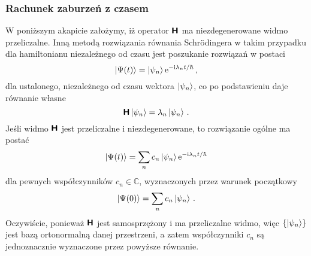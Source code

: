 \documentclass{myclass}
\begin{document}
\subsubsection{Rachunek zaburzeń z czasem}
W poniższym akapicie założymy, iż operator \(\boldsymbol{\mathsf{H}}\) ma niezdegenerowane widmo przeliczalne. Inną
metodą rozwiązania równania Schr\"{o}dingera w takim przypadku dla hamiltonianu niezależnego od
czasu jest poszukanie rozwiązań w postaci
\begin{equation*}
    \ket{\Psi(t)} = \ket{\psi_n}\mathrm{e}^{-\mathrm{i}\lambda_nt/\hbar}\,,
\end{equation*}
dla ustalonego, niezależnego od czasu wektora \(\ket{\psi_n}\), co po podstawieniu daje równanie
własne
\begin{equation*}
    \boldsymbol{\mathsf{H}}\ket{\psi_n} = \lambda_n\ket{\psi_n}\,.
\end{equation*}
Jeśli widmo \(\boldsymbol{\mathsf{H}}\) jest przeliczalne i niezdegenerowane, to rozwiązanie ogólne ma postać
\begin{equation*}
    \ket{\Psi(t)} = \sum_n c_n\ket{\psi_n}\mathrm{e}^{-\mathrm{i}\lambda_nt/\hbar}
\end{equation*}
dla pewnych współczynników \(c_n\in\mathbb{C}\), wyznaczonych przez warunek początkowy
\begin{equation*}
    \ket{\Psi(0)} = \sum_n c_n\ket{\psi_n}\,.
\end{equation*}
Oczywiście, ponieważ \(\boldsymbol{\mathsf{H}}\) jest samosprzężony i ma przeliczalne widmo, więc
\(\{\ket{\psi_n}\}\) jest bazą ortonormalną danej przestrzeni, a zatem współczynniki \(c_n\) są
jednoznacznie wyznaczone przez powyższe równanie.
\medskip
\end{document}

